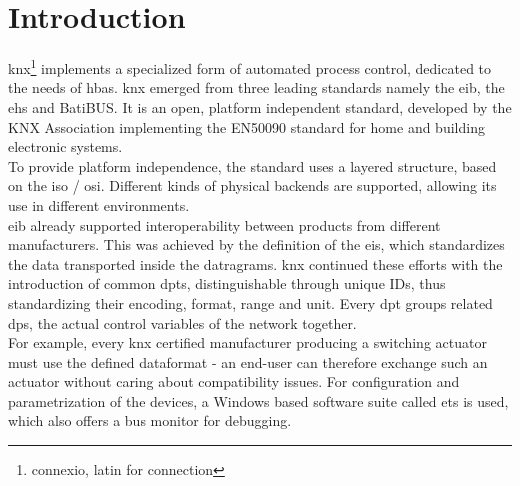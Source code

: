 \label{chap3}
\section{Introduction}

\gls{knx}\footnote{connexio, latin for connection} implements a specialized form of automated process control, dedicated to the needs of \gls{hbas}. \gls{knx}
emerged from three leading standards namely the \gls{eib}, the \gls{ehs} and BatiBUS. It is an open, platform independent standard,
developed by the KNX Association implementing the EN50090 standard for home and building electronic systems.
\\
To provide platform independence, the standard uses a layered structure, based on the \gls{iso} / \gls{osi}. Different kinds of physical backends are supported,
allowing its use in different environments.
\\
\gls{eib} already supported interoperability between products from different manufacturers. This was achieved by
the definition of the \gls{eis}, which standardizes
the data transported inside the datragrams. \gls{knx} continued these efforts with the introduction of common \glspl{dpt}, distinguishable through unique IDs, thus
standardizing their encoding, format, range and unit.
Every \gls{dpt} groups related \glspl{dp}, the actual control variables of the network together.
\\
For example, every \gls{knx} 
certified manufacturer producing a switching actuator must use the defined dataformat - an end-user can therefore exchange such an actuator without caring
about compatibility issues. For configuration and parametrization of the devices, a Windows based software suite called \gls{ets} is used, which also offers
a bus monitor for debugging.
